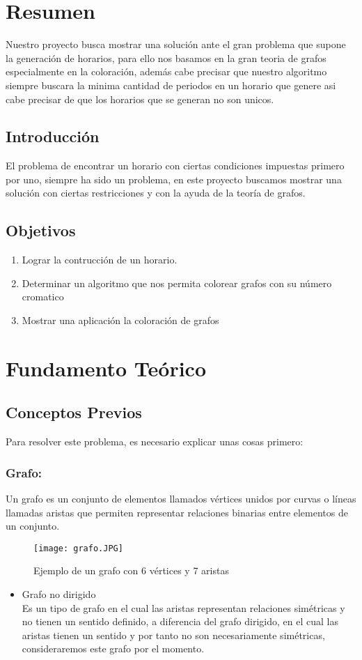 \documentclass[letterpaper,12pt]{article}
\begin{document}
    \section{Resumen}
    Nuestro proyecto busca mostrar una solución ante el gran problema que supone la generación de horarios, para ello nos basamos en la gran teoria de grafos especialmente en la coloración, además cabe precisar que nuestro algoritmo siempre buscara la minima cantidad de periodos en un horario que genere asi cabe precisar de que los horarios que se generan no son unicos.
    \subsection{Introducción}
    El problema de encontrar un horario con ciertas condiciones impuestas primero por uno, siempre ha sido un problema, en este proyecto buscamos mostrar una solución con ciertas restricciones y con la ayuda de la teoría de grafos.
    \subsection{Objetivos}
    \begin{enumerate}
     \item Lograr la contrucción de un horario.
     \item Determinar un algoritmo que nos permita colorear grafos con su número cromatico
     \item Mostrar una aplicación la coloración de grafos
    \end{enumerate}
    \section{Fundamento Teórico}
    \subsection{Conceptos Previos}
    Para resolver este problema, es necesario explicar unas cosas primero:
    \subsubsection{Grafo:}
     Un grafo es un conjunto de elementos llamados vértices unidos por curvas o líneas llamadas aristas que permiten representar relaciones binarias entre elementos de un conjunto. 
    \begin{figure} [h]
         \centering
         \texttt{[image: grafo.JPG]}
         \caption{Ejemplo de un grafo con 6 vértices y 7 aristas}
         \label{fig:grafo}
    \end{figure}
    \begin{itemize}
        \item Grafo no dirigido \\
         Es un tipo de grafo en el cual las aristas representan relaciones simétricas y no tienen un sentido definido, a diferencia del grafo dirigido, en el cual las aristas tienen un sentido y por tanto no son necesariamente simétricas, consideraremos este grafo por el momento.
    \end{itemize}
\end{document}
